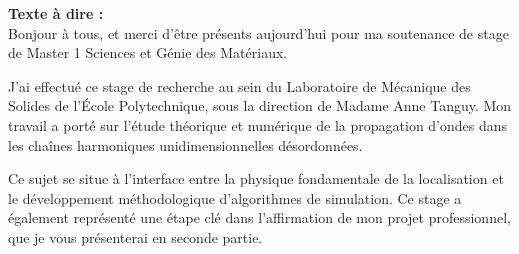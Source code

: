 \documentclass[11pt,a4paper]{article}
\begin{document}
\begin{tcolorbox}[colback=blue!5,colframe=blue!75!black,title=Slide 1 : Page de Garde --- 0:00 à 0:45]
\textbf{Texte à dire :} \\
\og  Bonjour à tous, et merci d'être présents aujourd'hui pour ma soutenance de stage de Master 1 Sciences et Génie des Matériaux. 

J'ai effectué ce stage de recherche au sein du Laboratoire de Mécanique des Solides de l'École Polytechnique, sous la direction de Madame Anne Tanguy. Mon travail a porté sur l'étude théorique et numérique de la propagation d'ondes dans les chaînes harmoniques unidimensionnelles désordonnées. 

Ce sujet se situe à l'interface entre la physique fondamentale de la localisation et le développement méthodologique d'algorithmes de simulation. Ce stage a également représenté une étape clé dans l'affirmation de mon projet professionnel, que je vous présenterai en seconde partie. \fg{}
\end{tcolorbox}
\end{document}
